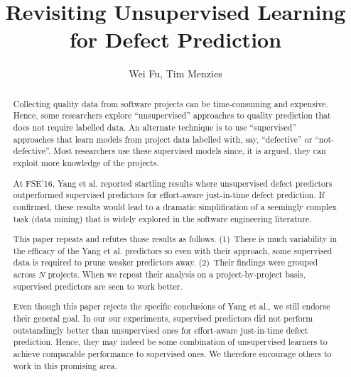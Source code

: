 \documentclass[sigconf]{acmart}
\theoremstyle{break}
\begin{document}
\title{Revisiting Unsupervised Learning for Defect Prediction}


\author{Wei Fu,  Tim Menzies}







\begin{abstract}
Collecting quality  data from software projects
can be time-consuming and expensive. Hence,
	 some researchers explore ``unsupervised'' approaches
	 to quality  prediction that does not require labelled data.  An alternate technique is to use ``supervised'' approaches
	 that learn models from project data labelled with, say, 
	 ``defective'' or ``not-defective''.
	Most researchers use these supervised models
	since, it is argued, they can
	 exploit more 
	knowledge of the projects. 

	At FSE'16, Yang et al.  reported startling results
	where 
	unsupervised defect predictors 
	outperformed supervised
	predictors for effort-aware just-in-time defect prediction.
	If confirmed, these results  would
lead to a dramatic simplification of a seemingly complex task
(data mining) that is
widely explored in the software engineering  literature.
 
	This paper repeats and refutes those results as follows.
	(1)~There is much variability in the efficacy of the Yang et al.
	predictors so even with their approach, some supervised data is required
	to prune  weaker predictors away.
	(2)~Their findings were grouped across
	$N$  projects. When we repeat their analysis
	on a project-by-project basis, supervised 
	predictors are seen to work better.

Even though this paper rejects the specific conclusions of Yang et al.,
	we still endorse their  general goal. In our our experiments, supervised
	predictors did not perform outstandingly
	better than unsupervised ones for effort-aware just-in-time defect prediction.
	Hence, they may indeed be some
	combination of unsupervised
	learners to achieve comparable performance to supervised ones.
	We therefore encourage others to work in this promising area.
\end{abstract}
\end{document}
